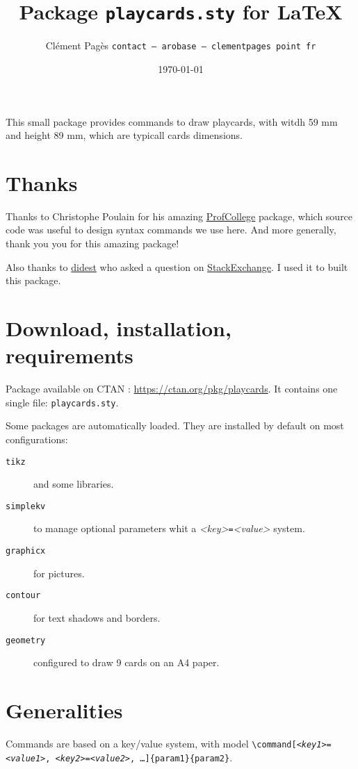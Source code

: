 \documentclass[a4paper, 12pt]{article}
\title{Package \texttt{playcards.sty} for \LaTeX}
\date{\today}
\author{Clément Pagès \texttt{contact -- arobase -- clementpages point fr}}
\newcommand{\package}[1]{\texttt{#1}}
\newcommand{\kv}[2]{\textit{<#1>}\texttt=\textit{<#2>}}
\begin{document}
\maketitle

This small package provides commands to draw playcards, with witdh 59 mm and height 89 mm, which are typicall cards dimensions.

\tableofcontents
\section*{Thanks}
Thanks to Christophe Poulain for his amazing \href{https://ctan.org/pkg/profcollege}{ProfCollege} package, which source code was useful to design syntax commands we use here. And more generally, thank you you for this amazing package!

Also thanks to \href{https://tex.stackexchange.com/users/1948/didest}{didest} who asked a question on \href{https://tex.stackexchange.com/questions/47924/creating-playing-cards-using-tikz}{StackExchange}. I used it to built this package.

\section{Download, installation, requirements}

Package available on CTAN : \href{https://ctan.org/pkg/playcards}{https://ctan.org/pkg/playcards}. It contains one single file: \texttt{playcards.sty}.

Some packages are automatically loaded. They are installed by default on most configurations:
\begin{description}
	\item[\package{tikz}] and some libraries.
	\item[\package{simplekv}] to manage optional parameters whit a \kv{key}{value} system.
	\item[\package{graphicx}] for pictures. 
	\item[\package{contour}] for text shadows and borders.
	\item[\package{geometry}] configured to draw 9 cards on an A4 paper.
\end{description}

\section{Generalities}
Commands are based on a key/value system, with model \texttt{\textbackslash command[\kv{key1}{value1}, \kv{key2}{value2}, …]\{param1\}\{param2\}}.
\end{document}
